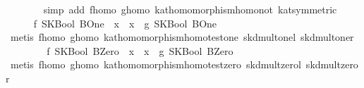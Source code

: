 \begin{isabellebody}
\ \ \ \ \ \ \isamarkupfalse%
\ {}simp\ add{}\ f{}homo\ g{}homo\ kat{}homomorphism{}homo{}not\ kat{}{}symmetric{}{}\isanewline
\ \ \isamarkupfalse%
\isanewline
\ \ \ \ \isamarkupfalse%
\ {}f\ {}SKBool\ BOne{}\ {}\ x\ {}\ x\ {}\ g\ {}SKBool\ BOne{}{}\isanewline
\ \ \ \ \ \ \isamarkupfalse%
\ {}metis\ f{}homo\ g{}homo\ kat{}homomorphism{}homo{}test{}one\ skd{}mult{}onel\ skd{}mult{}oner{}\isanewline
\ \ \isamarkupfalse%
\isanewline
\ \ \ \ \isamarkupfalse%
\ {}f\ {}SKBool\ BZero{}\ {}\ x\ {}\ x\ {}\ g\ {}SKBool\ BZero{}{}\isanewline
\ \ \ \ \ \ \isamarkupfalse%
\ {}metis\ f{}homo\ g{}homo\ kat{}homomorphism{}homo{}test{}zero\ skd{}mult{}zerol\ skd{}mult{}zeror{}\isanewline
\ \ \isamarkupfalse%

\end{isabellebody}

